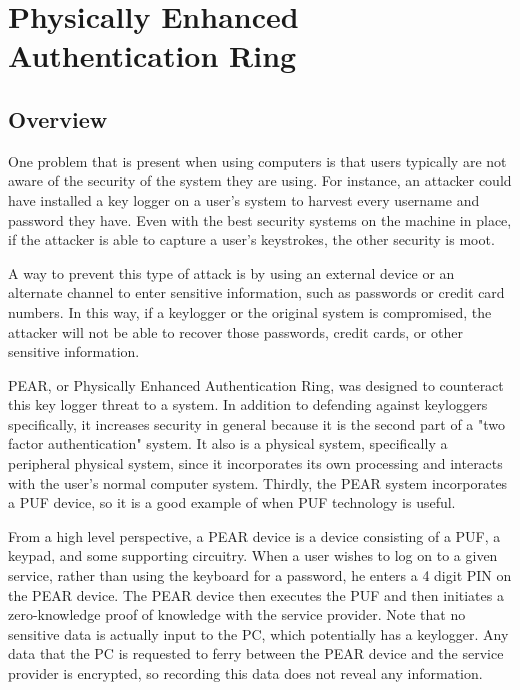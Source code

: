 
\chapter{Physically Enhanced Authentication Ring}
\label{chapter:pear}

\section{Overview}
One problem that is present when using computers is that users typically are not aware of the security of the system
they are using. For instance, an attacker could have installed a key logger on a user's system to harvest every username
and password they have. Even with the best security systems on the machine in place, if the attacker is able to capture
a user's keystrokes, the other security is moot. 

A way to prevent this type of attack is by using an external device or an alternate channel to enter sensitive information,
such as passwords or credit card numbers. In this way, if a keylogger or the original system is compromised, the attacker
will not be able to recover those passwords, credit cards, or other sensitive information.

PEAR, or Physically Enhanced Authentication Ring, was designed to counteract this key logger threat to a system. In addition
to defending against keyloggers specifically, it increases security in general because it is the second part of a "two factor
authentication" system. It also is a physical system, specifically a peripheral physical system, since it incorporates its
own processing and interacts with the user's normal computer system. Thirdly, the PEAR system incorporates a PUF device,
so it is a good example of when PUF technology is useful.

From a high level perspective, a PEAR device is a device consisting of a PUF, a keypad, and some supporting circuitry. When
a user wishes to log on to a given service, rather than using the keyboard for a password, he enters a 4 digit PIN on the PEAR
device. The PEAR device then executes the PUF and then initiates a zero-knowledge proof of knowledge with the service
provider. Note that no sensitive data is actually input to the PC, which potentially has a keylogger. Any data that the PC
is requested to ferry between the PEAR device and the service provider is encrypted, so recording this data does not reveal
any information.

